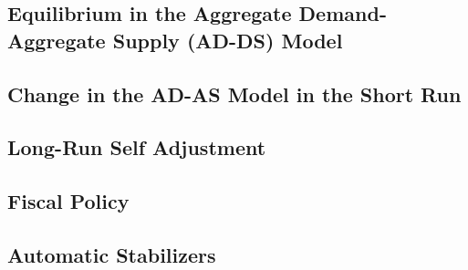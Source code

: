 \documentclass[8pt]{beamer}
\begin{document}
  \begin{frame}
	\section{Equilibrium in the Aggregate Demand-Aggregate Supply (AD-DS) Model}
  \end{frame}
  \begin{frame}
	\section{Change in the AD-AS Model in the Short Run}
  \end{frame}
  \begin{frame}
	\section{Long-Run Self Adjustment}
  \end{frame}
  \begin{frame}
	\section{Fiscal Policy}
  \end{frame}
  \begin{frame}
	\section{Automatic Stabilizers}
  \end{frame}
\end{document}
